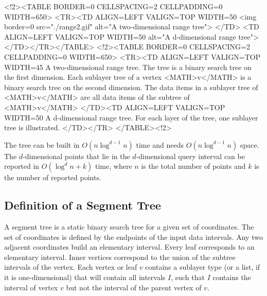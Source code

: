 \begin{ccHtmlOnly}
    <!2><TABLE BORDER=0 CELLSPACING=2 CELLPADDING=0 WIDTH=650>
        <TR><TD ALIGN=LEFT VALIGN=TOP WIDTH=50%
    <img border=0 src="./range2.gif" alt="A two-dimensional range tree">
    </TD>
    <TD ALIGN=LEFT VALIGN=TOP WIDTH=50%
alt="A
    d-dimensional range tree">
      </TD></TR></TABLE>
        <!2><TABLE BORDER=0 CELLSPACING=2 CELLPADDING=0 WIDTH=650>
        <TR><TD ALIGN=LEFT VALIGN=TOP WIDTH=45%
    A two-dimensional range tree. The
      tree is a binary search tree on the first dimension. Each
      sublayer tree of a vertex <MATH>v</MATH> is a binary search tree on the
second
      dimension. The data items in a sublayer tree of <MATH>v</MATH> are
      all data items of the subtree of <MATH>v</MATH>
 </TD><TD ALIGN=LEFT VALIGN=TOP WIDTH=50%
A d-dimensional range tree. For
      each layer of the tree, one
      sublayer tree is illustrated.
 </TD></TR>
        </TABLE><!2>

\end{ccHtmlOnly}


The tree can be built in  $O(n\log^{d-1} n)$ time and
needs  $O(n\log^{d-1} n)$ space. The $d$-dimensional points that lie in the
$d$-dimensional query interval can be reported in $O(\log^dn+k)$ time,
where $n$ is the total number of points and $k$ is the number of
reported points. 

\subsection{Definition of a Segment Tree}
A segment tree is a static binary search tree for a given set of
coordinates. The set of coordinates is defined by the endpoints
of the input data intervals. Any two adjacent coordinates
build an elementary interval. Every leaf corresponds to an
elementary interval.
Inner vertices
correspond to the union of the subtree intervals of the vertex.
Each vertex or leaf $v$ contains a sublayer type (or a
list, if it is one-dimensional) that will contain all intervals $I$, such that
$I$  contains the interval of vertex $v$ but not the interval
of the parent vertex of $v$.

